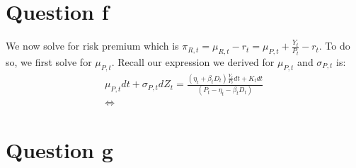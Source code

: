 \documentclass{article}
\begin{document}
\section*{Question f}
We now solve for risk premium which is $\pi_{R, t} = \mu_{R, t} - r_t = \mu_{P, t} + \frac{Y_t}{P_t} - r_t$. To do so, we first solve for $\mu_{P, t}$. Recall our expression we derived for $\mu_{P, t}$ and $\sigma_{P, t }$ is:
\[\begin{aligned}
    \mu_{P, t} d t+\sigma_{P, t} d Z_{t} = \frac{(\eta_t + \beta_t D_t) \frac{Y_t}{P_t} d t + K_t d t}{(P_t - \eta_t - \beta_t D_t)}\\
    \iff 
\end{aligned}\]
\section*{Question g}
\end{document}
